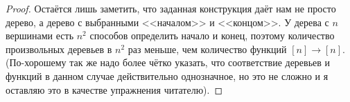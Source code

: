 \begin{proof}
Остаётся лишь заметить, что заданная конструкция даёт нам не просто дерево, а дерево с выбранными <<началом>> и <<концом>>. У дерева с $n$ вершинами есть $n^2$ способов определить начало и конец, поэтому количество произвольных деревьев в $n^2$ раз меньше, чем количество функций $[n]\to[n]$. (По-хорошему так же надо более чётко указать, что соответствие деревьев и функций в данном случае действительно однозначное, но это не сложно и я оставляю это в качестве упражнения читателю).
\end{proof}
